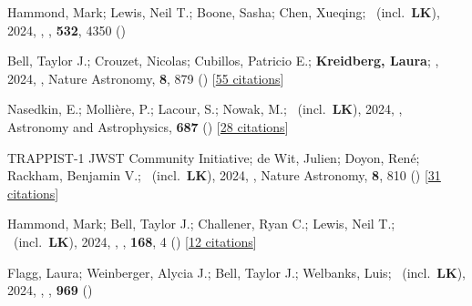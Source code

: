 \item[{\color{numcolor}\scriptsize117}] Hammond, Mark; Lewis, Neil T.; Boone, Sasha; Chen, Xueqing; \etal\ (incl.\ \textbf{LK}), 2024, , \mnras, \textbf{532}, 4350 ()

\item[{\color{numcolor}\scriptsize116}] Bell, Taylor J.; Crouzet, Nicolas; Cubillos, Patricio E.; \textbf{Kreidberg, Laura}; \etal, 2024, , Nature Astronomy, \textbf{8}, 879 () [\href{https://ui.adsabs.harvard.edu/abs/2024NatAs...8..879B}{55 citations}]

\item[{\color{numcolor}\scriptsize115}] Nasedkin, E.; Molli{\`e}re, P.; Lacour, S.; Nowak, M.; \etal\ (incl.\ \textbf{LK}), 2024, , Astronomy and Astrophysics, \textbf{687} () [\href{https://ui.adsabs.harvard.edu/abs/2024A&A...687A.298N}{28 citations}]

\item[{\color{numcolor}\scriptsize114}] TRAPPIST-1 JWST Community Initiative; de Wit, Julien; Doyon, Ren{\'e}; Rackham, Benjamin V.; \etal\ (incl.\ \textbf{LK}), 2024, , Nature Astronomy, \textbf{8}, 810 () [\href{https://ui.adsabs.harvard.edu/abs/2024NatAs...8..810T}{31 citations}]

\item[{\color{numcolor}\scriptsize113}] Hammond, Mark; Bell, Taylor J.; Challener, Ryan C.; Lewis, Neil T.; \etal\ (incl.\ \textbf{LK}), 2024, , \aj, \textbf{168}, 4 () [\href{https://ui.adsabs.harvard.edu/abs/2024AJ....168....4H}{12 citations}]

\item[{\color{numcolor}\scriptsize112}] Flagg, Laura; Weinberger, Alycia J.; Bell, Taylor J.; Welbanks, Luis; \etal\ (incl.\ \textbf{LK}), 2024, , \apj, \textbf{969} ()


